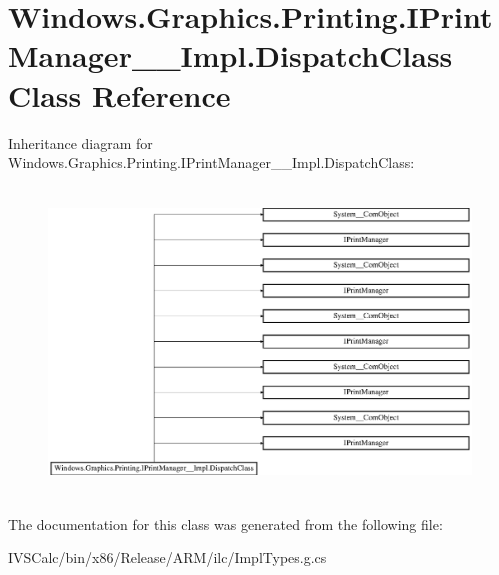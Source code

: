 \hypertarget{class_windows_1_1_graphics_1_1_printing_1_1_i_print_manager_____impl_1_1_dispatch_class}{}\section{Windows.\+Graphics.\+Printing.\+I\+Print\+Manager\+\_\+\+\_\+\+Impl.\+Dispatch\+Class Class Reference}
\label{class_windows_1_1_graphics_1_1_printing_1_1_i_print_manager_____impl_1_1_dispatch_class}
Inheritance diagram for Windows.\+Graphics.\+Printing.\+I\+Print\+Manager\+\_\+\+\_\+\+Impl.\+Dispatch\+Class\+:\begin{figure}[H]
\begin{center}
\leavevmode
\includegraphics[height=8.191490cm]{class_windows_1_1_graphics_1_1_printing_1_1_i_print_manager_____impl_1_1_dispatch_class}
\end{center}
\end{figure}


The documentation for this class was generated from the following file\+:\begin{DoxyCompactItemize}
\item 
I\+V\+S\+Calc/bin/x86/\+Release/\+A\+R\+M/ilc/Impl\+Types.\+g.\+cs\end{DoxyCompactItemize}
